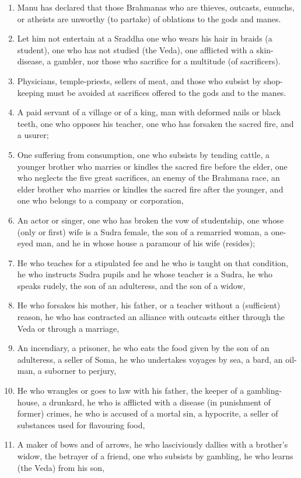 \begin{enumerate}
\item Manu has declared that those Brahmanas who are thieves, outcasts, eunuchs, or atheists are unworthy (to partake) of oblations to the gods and manes.
\item Let him not entertain at a Sraddha one who wears his hair in braids (a student), one who has not studied (the Veda), one afflicted with a skin-disease, a gambler, nor those who sacrifice for a multitude (of sacrificers).
\item Physicians, temple-priests, sellers of meat, and those who subsist by shop-keeping must be avoided at sacrifices offered to the gods and to the manes.
\item A paid servant of a village or of a king, man with deformed nails or black teeth, one who opposes his teacher, one who has forsaken the sacred fire, and a usurer;
\item One suffering from consumption, one who subsists by tending cattle, a younger brother who marries or kindles the sacred fire before the elder, one who neglects the five great sacrifices, an enemy of the Brahmana race, an elder brother who marries or kindles the sacred fire after the younger, and one who belongs to a company or corporation,
\item An actor or singer, one who has broken the vow of studentship, one whose (only or first) wife is a Sudra female, the son of a remarried woman, a one-eyed man, and he in whose house a paramour of his wife (resides);
\item He who teaches for a stipulated fee and he who is taught on that condition, he who instructs Sudra pupils and he whose teacher is a Sudra, he who speaks rudely, the son of an adulteress, and the son of a widow,
\item He who forsakes his mother, his father, or a teacher without a (sufficient) reason, he who has contracted an alliance with outcasts either through the Veda or through a marriage,
\item An incendiary, a prisoner, he who eats the food given by the son of an adulteress, a seller of Soma, he who undertakes voyages by sea, a bard, an oil-man, a suborner to perjury,
\item He who wrangles or goes to law with his father, the keeper of a gambling-house, a drunkard, he who is afflicted with a disease (in punishment of former) crimes, he who is accused of a mortal sin, a hypocrite, a seller of substances used for flavouring food,
\item A maker of bows and of arrows, he who lasciviously dallies with a brother's widow, the betrayer of a friend, one who subsists by gambling, he who learns (the Veda) from his son,

\end{enumerate}
